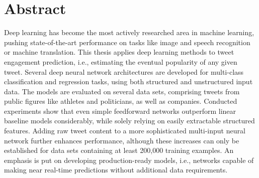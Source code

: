 \section*{Abstract}

Deep learning has become the most actively researched area in machine learning,
pushing state-of-the-art performance on tasks like image and speech recognition
or machine translation.
This thesis applies deep learning methods to tweet engagement prediction, i.e.,
estimating the eventual popularity of any given tweet.
Several deep neural network architectures are developed for multi-class classification
and regression tasks, using both structured and unstructured input data.
The models are evaluated on several data sets, comprising tweets from public
figures like athletes and politicians, as well as companies.
Conducted experiments show that even simple feedforward networks outperform
linear baseline models considerably, while solely relying on easily extractable
structured features.
Adding raw tweet content to a more sophisticated multi-input neural network
further enhances performance, although these increases can only
be established for data sets containing at least 200,000 training examples.
An emphasis is put on developing production-ready models, i.e., networks
capable of making near real-time predictions without additional data
requirements.
